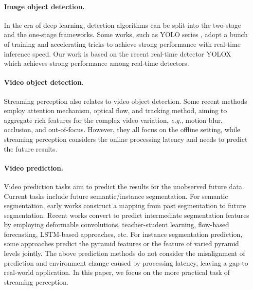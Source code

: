 \documentclass[10pt,twocolumn,letterpaper]{article}
\begin{document}
\paragraph{Image object detection.} In the era of deep learning, detection algorithms can be split into the two-stage \cite{fastrcnn,fpn,fasterrcnn,liu2019pay,wu2020multi,zheng2020cross} and the one-stage \cite{ssd,retinanet,fcos,yolo1,rfb,adaptivenms,iqdet,autoassign,borderdet,lla} frameworks. Some works, such as YOLO series \cite{yolo1,yolo2,yolo3,yolo4,yolo5,yolox}, adopt a bunch of training and accelerating tricks to achieve strong performance with real-time inference speed. Our work is based on the recent real-time detector YOLOX \cite{yolox} which achieves strong performance among real-time detectors. 

\paragraph{Video object detection.} Streaming perception also relates to video object detection. Some recent methods\cite{mega,rdn,fgfa,tracker} employ attention mechanism, optical flow, and tracking method,  aiming to aggregate rich features for the complex video variation, \emph{e.g.}, motion blur, occlusion, and out-of-focus. However, they all focus on the offline setting, while streaming perception considers the online processing latency and needs to predict the future results.

\paragraph{Video prediction.} Video prediction tasks aim to predict the results for the unobserved future data. Current tasks include future semantic/instance segmentation. For semantic segmentation, early works \cite{predicting,bayesian} construct a mapping from past segmentation to future segmentation. Recent works \cite{segmenting,vsaric2019single,warp,predictive} convert to predict intermediate segmentation features by employing deformable convolutions, teacher-student learning,  flow-based forecasting, LSTM-based approaches, etc. For instance segmentation prediction, some approaches predict the pyramid features\cite{luc2018predicting} or the feature of varied pyramid
levels jointly\cite{sun2019predicting,apanet}. The above prediction methods do not consider the misalignment of prediction and environment change caused by processing latency, leaving a gap to real-world application. In this paper, we focus on the more practical task of streaming perception. 
\end{document}
